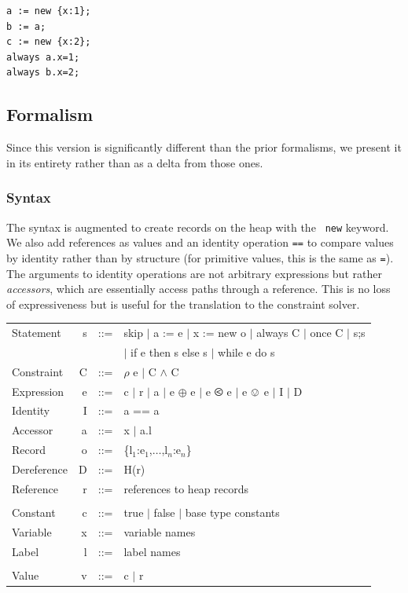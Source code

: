 \documentclass{article}
\begin{document}
\begin{verbatim}
a := new {x:1};
b := a;
c := new {x:2};
always a.x=1;
always b.x=2;
\end{verbatim}

\subsection{Formalism}

Since this version is significantly different than the prior formalisms, 
we present it in its entirety rather than as a delta from those ones.

\subsubsection{Syntax}

The syntax is augmented to create records on the heap with the {\tt
  new} keyword. We also add references as values and an identity
operation {\tt ==} to compare values by identity rather than by
structure (for primitive values, this is the same as {\tt =}). The
arguments to identity operations are not arbitrary expressions but
rather {\em accessors}, which are essentially access paths through a
reference.  This is no loss of expressiveness but is useful for the
translation to the constraint solver.

\begin{tt}
\begin{tabular}{lrrl}
{\rm Statement} & s & ::= & skip $\mid$ a := e $\mid$ x := new o $\mid$ always C $\mid$ once C $\mid$ s;s \\
  & & & $\mid$ if e then s else s $\mid$ while e do s \\
{\rm Constraint} & C & ::= & $\rho$ e $\mid$ C $\wedge$ C\\
{\rm Expression} & e & ::= & c $\mid$ r $\mid$ a $\mid$ e $\oplus$ e  $\mid$ e
$\olessthan$ e $\mid$ e $\ovee$ e $\mid$ I $\mid$ D \\
{\rm Identity} & I & ::= & a == a\\
{\rm Accessor} & a & ::= & x $\mid$ a.l \\
{\rm Record} & o & ::= & \{l$_1$:e$_1$,$\ldots$,l$_n$:e$_n$\} \\
{\rm Dereference} & D & ::= & H(r)\\
{\rm Reference} & r & ::= & {\rm references to heap records} \\\\
{\rm Constant} & c & ::= & true $\mid$ false $\mid$ {\rm base type constants}\\
{\rm Variable} & x & ::= & {\rm variable names} \\
{\rm Label} & l & ::= & {\rm label names} \\\\

{\rm Value} & v & ::= & c $\mid$ r
\end{tabular}
\end{tt}
\end{document}
